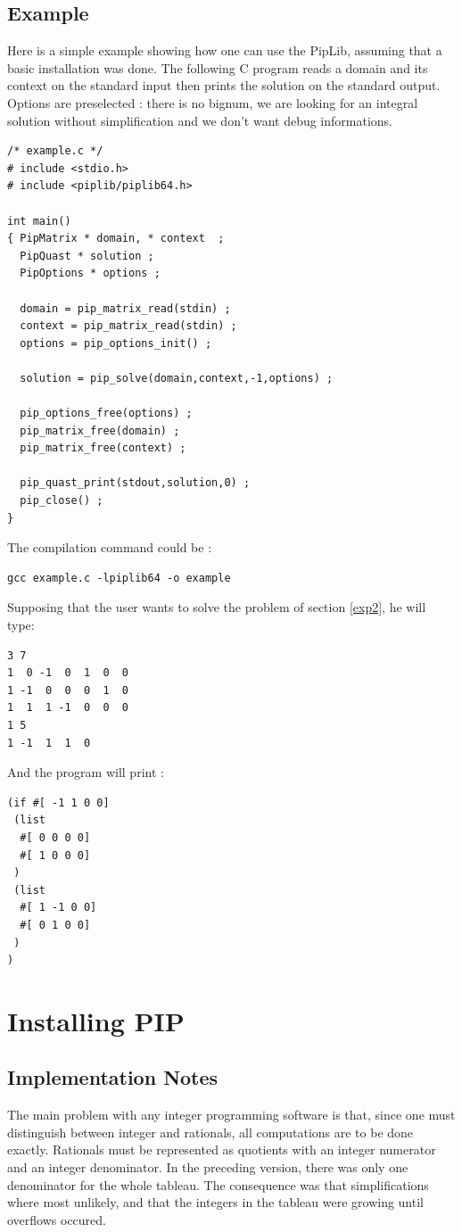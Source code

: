 \documentclass[12pt,a4paper]{article}
\begin{document}
\subsection{Example}
Here is a simple example showing how one can use the PipLib, assuming that
a basic installation was done. The following C program reads a domain and its
context on the standard input then prints the solution on the standard output.
Options are preselected : there is no bignum, we are looking for an integral
solution without simplification and we don't want debug informations.
\begin{verbatim}
/* example.c */
# include <stdio.h>
# include <piplib/piplib64.h>

int main()
{ PipMatrix * domain, * context  ;
  PipQuast * solution ;
  PipOptions * options ;
 
  domain = pip_matrix_read(stdin) ;
  context = pip_matrix_read(stdin) ;
  options = pip_options_init() ;

  solution = pip_solve(domain,context,-1,options) ;

  pip_options_free(options) ;
  pip_matrix_free(domain) ;
  pip_matrix_free(context) ;

  pip_quast_print(stdout,solution,0) ;
  pip_close() ;
}
\end{verbatim}
The compilation command could be :
\begin{verbatim}
gcc example.c -lpiplib64 -o example
\end{verbatim}
Supposing that the user wants to solve the problem of section \ref{exp2}, he
will type:
\begin{verbatim}
3 7
1  0 -1  0  1  0  0 
1 -1  0  0  0  1  0 
1  1  1 -1  0  0  0 
1 5
1 -1  1  1  0 
\end{verbatim}
And the program will print :
\begin{verbatim}
(if #[ -1 1 0 0]
 (list
  #[ 0 0 0 0]
  #[ 1 0 0 0]
 )
 (list
  #[ 1 -1 0 0]
  #[ 0 1 0 0]
 )
)
\end{verbatim}

\section{Installing PIP}

\subsection{Implementation Notes}

The main problem with any integer programming software is that, since one
must distinguish between integer and rationals, all computations are
to be done exactly. Rationals must be represented as quotients with
an integer numerator and an integer denominator. In the preceding version,
there was only one denominator for the whole tableau. The consequence
was that simplifications where most unlikely, and that the integers
in the tableau were growing until overflows occured.
\end{document}
